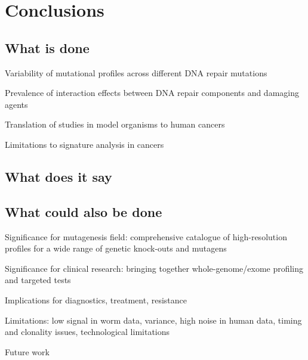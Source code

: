 

\pagestyle{empty}
\section{Conclusions}

\subsection*{What is done}

Variability of mutational profiles across different DNA repair mutations

Prevalence of interaction effects between DNA repair components and damaging agents

Translation of studies in model organisms to human cancers

Limitations to signature analysis in cancers


\subsection*{What does it say}


\subsection*{What could also be done}


Significance for mutagenesis field: comprehensive catalogue of high-resolution profiles for a wide range of genetic knock-outs and mutagens

Significance for clinical research: bringing together whole-genome/exome profiling and targeted tests

Implications for diagnostics, treatment, resistance

Limitations: low signal in worm data, variance, high noise in human data, timing and clonality issues, technological limitations

Future work






